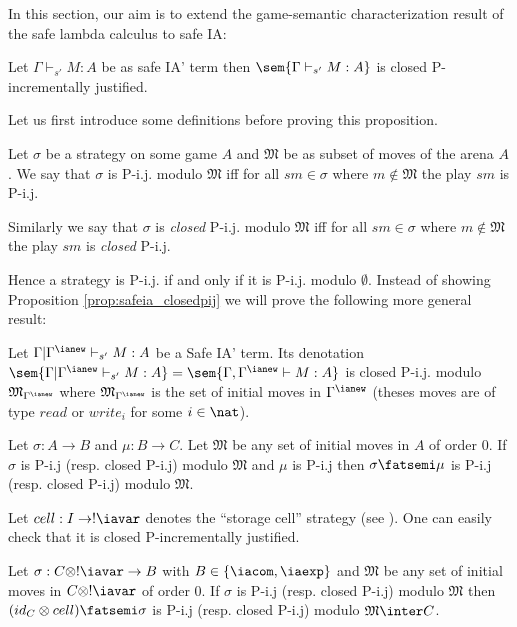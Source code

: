 In this section, our aim is to extend the game-semantic
characterization result of the safe lambda calculus to safe IA:
\begin{proposition}
\label{prop:safeia_closedpij}
  Let $\Gamma \vdash_{s'} M : A$ be as safe IA' term then $\sem{\Gamma \vdash_{s'} M :
  A}$ is closed P-incrementally justified.
\end{proposition}


Let us first introduce some definitions before proving this
proposition.

\begin{definition}
\label{def:pij_modulo} Let $\sigma$ be a strategy on some game $A$
and $\mathfrak{M}$ be as subset of moves of the arena $A$. We say
that $\sigma$ is P-i.j. modulo $\mathfrak{M}$ iff for all $s m \in
\sigma$ where $m \not\in \mathfrak{M}$ the play $s m$ is P-i.j.

Similarly we say that $\sigma$ is \emph{closed} P-i.j. modulo
$\mathfrak{M}$ iff for all $s m \in \sigma$ where $m \not\in
\mathfrak{M}$ the play $s m$ is \emph{closed} P-i.j.
\end{definition}
Hence a strategy is P-i.j. if and only if it is P-i.j. modulo
$\emptyset$. Instead of showing Proposition
\ref{prop:safeia_closedpij} we will prove the following more general
result:
\begin{proposition}
\label{prop:safeia_closedpijmodulo} Let $\Gamma | \Gamma^{\ianew}
\vdash_{s'} M : A $ be a Safe IA' term. Its denotation $\sem{\Gamma
| \Gamma^{\ianew} \vdash_{s'} M : A} = \sem{\Gamma, \Gamma^{\ianew}
\vdash M : A}$ is closed P-i.j. modulo
$\mathfrak{M}_{\Gamma^{\ianew}}$ where
$\mathfrak{M}_{\Gamma^{\ianew}}$ is the set of initial moves in
$\Gamma^{\ianew}$ (theses moves are of type $read$ or $write_i$ for
some $i\in \nat$).
\end{proposition}


\begin{lemma}
Let $\sigma : A \rightarrow B$ and $\mu : B \rightarrow C$.
  Let $\mathfrak{M}$ be any set of initial moves in $A$ of order $0$.
  If $\sigma$ is P-i.j (resp. closed P-i.j)  modulo $\mathfrak{M}$ and $\mu$ is P-i.j
  then $\sigma \fatsemi \mu$ is P-i.j (resp. closed P-i.j) modulo $\mathfrak{M}$.
\end{lemma}
\notetoself{
\begin{proof}
\end{proof}
}

Let $cell : I \rightarrow !\iavar$ denotes the ``storage cell''
strategy (see \cite{abramsky:game-semantics-tutorial}). One can
easily check that it is closed P-incrementally justified.
\begin{lemma}
Let $\sigma : C \otimes !\iavar \rightarrow B$ with $B \in \{\iacom,
\iaexp \}$ and $\mathfrak{M}$ be any set of initial moves in $C
\otimes !\iavar$ of order $0$.
  If $\sigma$ is P-i.j (resp. closed P-i.j) modulo $\mathfrak{M}$
  then $(id_C \otimes cell) \fatsemi \sigma$ is P-i.j (resp. closed P-i.j) modulo $\mathfrak{M} \inter C$.
\end{lemma}
\notetoself{
\begin{proof}
\end{proof}
}


